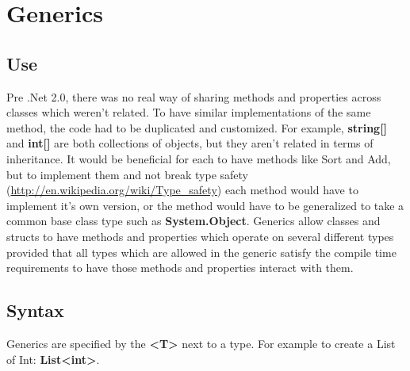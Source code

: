 \documentclass {amsart}
\begin{document}
	\section{Generics}
		\subsection{Use}  Pre .Net 2.0, there was no real way of sharing methods and properties across classes which weren't related.  To have similar implementations of the same method, the code had to be duplicated and customized.  For example, {\bf string[] } and {\bf int[]} are both collections of objects, but they aren't related in terms of inheritance.  It would be beneficial for each to have methods like Sort and Add, but to implement them and not break type safety (\url{http://en.wikipedia.org/wiki/Type_safety}) each method would have to implement it's own version, or the method would have to be generalized to take a common base class type such as {\bf System.Object}.  Generics allow classes and structs to have methods and properties which operate on several different types provided that all types which are allowed in the generic satisfy the compile time requirements to have those methods and properties interact with them.  
		\subsection{Syntax}  Generics are specified by the {\bf \textless T\textgreater} next to a type.  For example to create a List of Int: {\bf List\textless int\textgreater}.  
\end{document}
